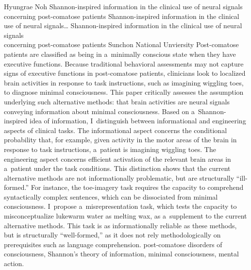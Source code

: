 \begin{artengenv}{Hyungrae Noh}
	{Shannon-inspired information in the clinical use of neural signals concerning post-comatose patients}
	{Shannon-inspired information in the clinical use of neural signals\ldots}
	{Shannon-inspired information in the clinical use of neural signals\\concerning post-comatose patients}
	{Sunchon National Unviersity}
	{Post-comatose patients are classified as being in a~minimally conscious state when they have executive functions. Because traditional behavioral assessments may not capture signs of executive functions in post-comatose patients, clinicians look to localized brain activities in response to task instructions, such as imagining wiggling toes, to diagnose minimal consciousness. This paper critically assesses the assumption underlying such alternative methods: that brain activities are neural signals conveying information about minimal consciousness. Based on a~Shannon-inspired idea of information, I~distinguish between informational and engineering aspects of clinical tasks. The informational aspect concerns the conditional probability that, for example, given activity in the motor areas of the brain in response to task instructions, a~patient is imagining wiggling toes. The engineering aspect concerns efficient activation of the relevant brain areas in a~patient under the task conditions. This distinction shows that the current alternative methods are not informationally problematic, but are structurally ``ill-formed.'' For instance, the toe-imagery task requires the capacity to comprehend syntactically complex sentences, which can be dissociated from minimal consciousness. I~propose a~misrepresentation task, which tests the capacity to misconceptualize lukewarm water as melting wax, as a~supplement to the current alternative methods. This task is as informationally reliable as these methods, but is structurally ``well-formed,'' as it does not rely methodologically on prerequisites such as language comprehension.
	}
	{post-comatose disorders of consciousness, Shannon's theory of information, minimal consciousness, mental action.}
	
	






\end{artengenv}
